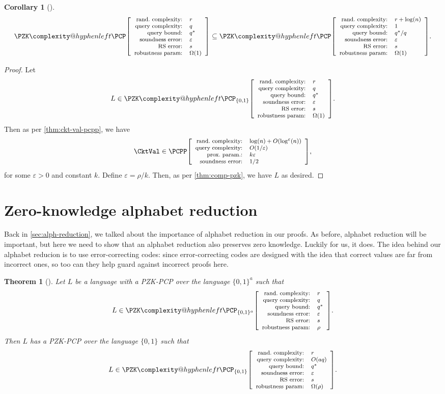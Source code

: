 \documentclass[english,12pt]{reedthesis}
\makeatletter
\theoremstyle{plain}
\newtheorem{thm}{Theorem}[section]
\newtheorem{cor}[cor]{Corollary}
\theoremstyle{definition}
\theoremstyle{remark}
\newcommand{\pcpp}[4]{%
  \ensuremath%
  \mleft[{\footnotesize\begin{array}{r l}
    \text{rand.\ complexity:} & #1 \\
    \text{query complexity:} & #2 \\
    \text{prox.\ param.:} & #3 \\
    \text{soundness error:} & #4
  \end{array}}\mright]%
}
\newcommand{\pzkpcpr}[6]{%
  \ensuremath%
  \mleft[{\footnotesize\begin{array}{r l}
    \text{rand.\ complexity:} & #1 \\
    \text{query complexity:} & #2 \\
    \text{query bound:} & #3 \\
    \text{soundness error:} & #4 \\
    \text{RS error:} & #5 \\
    \text{robustness param:} & #6
  \end{array}}\mright]%
}
\newcommand{\PZKPCP}{%
  \PZK\complexity@hyphenleft\PCP
}
\makeatother
\begin{document}
\begin{cor}[{\cite[Corollary 3.11]{GOS25}}]\label{cor:pzk-constant-query}
  \begin{equation}\label{eqn:pzk-constant-query}
    \PZKPCP\pzkpcpr{r}{q}{q^{*}}{\varepsilon}{s}{\Omega(1)} \subseteq
    \PZKPCP\pzkpcpr{r + \log(n)}{1}{q^{*}/q}{\varepsilon}{s}{\Omega(1)}.
  \end{equation}
\end{cor}

\begin{proof}
  Let
  \begin{equation}
    L \in \PZKPCP_{\{0, 1\}}\pzkpcpr{r}{q}{q^{*}}{\varepsilon}{s}{\Omega(1)}.
  \end{equation}
  Then as per \cref{thm:ckt-val-pcpp}, we have
  \begin{equation}
    \CktVal \in \PCPP\pcpp{\log(n) + O(\log^{\varepsilon}(n))}{O(1/\varepsilon)}{k\varepsilon}{1/2},
  \end{equation}
  for some $\varepsilon > 0$ and constant $k$. Define $\varepsilon = \rho/k$. Then, as per
  \cref{thm:comp-pzk}, we have $L$ as desired.
\end{proof}

\section{Zero-knowledge alphabet reduction}\label{sec:zk-alph-red}

Back in \cref{sec:alph-reduction}, we talked about the importance of alphabet
reduction in our proofs. As before, alphabet reduction will be important, but
here we need to show that an alphabet reduction also preserves zero knowledge.
Luckily for us, it does. The idea behind our alphabet reducion is to use
error-correcting codes: since error-correcting codes are designed with the idea
that correct values are far from incorrect ones, so too can they help guard
against incorrect proofs here.

\begin{thm}[{\cite[Lemma 2.13]{BGHSV06}}]%
  \label{thm:zk-alph-red}\label{alphabet reduction!zero-knowledge}
  Let $L$ be a language with a PZK-PCP over the language $\{0, 1\}^{a}$ such
  that
  \[
    L \in \PZKPCP_{\{0,1\}^{a}}\pzkpcpr{r}{q}{q^{*}}{\varepsilon}{s}{\rho}.
  \]
  Then $L$ has a PZK-PCP over the language $\{0, 1\}$ such that
  \[
    L \in \PZKPCP_{\{0,1\}}\pzkpcpr{r}{O(aq)}{q^{*}}{\varepsilon}{s}{\Omega(\rho)}.
  \]
\end{thm}
\end{document}

